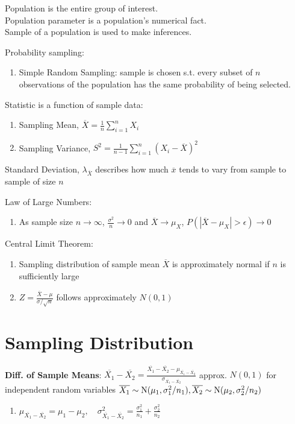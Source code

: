 \documentclass[12pt, a4paper]{article}
\begin{document}
\begin{multicols*}{3}
Population is the entire group of interest.\\ Population parameter is a population's numerical fact.\\Sample of a population is used to make inferences. 

Probability sampling:
\begin{enumerate}[\roman*.]
  \item Simple Random Sampling: sample is chosen s.t. every subset of $n$ observations of the population has the same probability of being selected.
\end{enumerate}

Statistic is a function of sample data:
\begin{enumerate}[\roman*.]
  \item Sampling Mean, $\overline{X} = \frac{1}{n}\sum^n_{i=1}X_i$
  \item Sampling Variance, $S^2 = \frac{1}{n-1} \sum^n_{i=1}(X_i-\overline{X})^2$
\end{enumerate}

Standard Deviation, $\lambda_{\overline{X}}$ describes how much $\overline{x}$ tends to vary from sample to sample of size $n$

Law of Large Numbers: 
\begin{enumerate}[\roman*.]
  \item As sample size $n\rightarrow\infty$, $\frac{\sigma^2}{n}\rightarrow 0$ and $\overline{X} \rightarrow\mu_X$, $P(|\overline{X}-\mu_X| > \epsilon) \rightarrow 0$
\end{enumerate}

Central Limit Theorem:
\begin{enumerate}[\roman*.]
  \item Sampling distribution of sample mean $\overline{X}$ is approximately normal if $n$ is sufficiently large 
  \item $Z = \frac{\overline{X}-\mu}{\sigma / \sqrt{n}}$ follows approximately $N(0, 1)$
\end{enumerate}

\colbreak
\section{Sampling Distribution}
\textbf{Diff. of Sample Means}: $\overline{X_1} - \overline{X_2} = \frac{\overline{X_1}-\overline{X_2} - \mu_{\overline{X_1}-\overline{X_2}}}{\sigma_{\overline{X_1}-\overline{X_2}}}$ approx. $N(0, 1)$ for independent random variables $\overline{X_1}\sim \text{N}(\mu_1, \sigma_1^2 /n_1), \overline{X_2}\sim\text{N}(\mu_2, \sigma_2^2 /n_2)$
\begin{enumerate}[\roman*.]
  \item $\mu_{\overline{X_1}-\overline{X_2}} = \mu_1 - \mu_2,\quad \sigma^2_{\overline{X_1}-\overline{X_2}} = \frac{\sigma_1^2}{n_1}+\frac{\sigma_2^2}{n_2}$
\end{enumerate}


\end{multicols*}
\end{document}

